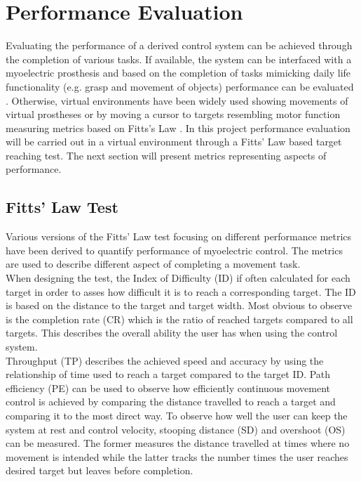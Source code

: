 \section{Performance Evaluation}

Evaluating the performance of a derived control system can be achieved through the completion of various tasks. If available, the system can be interfaced with a myoelectric prosthesis and based on the completion of tasks mimicking daily life functionality (e.g. grasp and movement of objects) performance can be evaluated \cite{Mastinu2018}. Otherwise, virtual environments have been widely used showing movements of virtual prostheses \cite{Powell2014} or by moving a cursor to targets resembling motor function measuring metrics based on Fitts's Law \cite{Wurth2014,Scheme2013,Hahne2014}. In this project performance evaluation will be carried out in a virtual environment through a Fitts' Law based target reaching test. The next section will present metrics representing aspects of performance. 

\subsection{Fitts' Law Test}        

Various versions of the Fitts' Law test focusing on different performance metrics have been derived to quantify performance of myoelectric control. The metrics are used to describe different aspect of completing a movement task. \\
When designing the test, the Index of Difficulty (ID) if often calculated for each target in order to asses how difficult it is to reach a corresponding target. The ID is based on the distance to the target and target width.  
Most obvious to observe is the completion rate (CR) which is the ratio of reached targets compared to all targets. This describes the overall ability the user has when using the control system. \\
Throughput (TP) describes the achieved speed and accuracy by using the relationship of time used to reach a target compared to the target ID. 
Path efficiency (PE) can be used to observe how efficiently continuous movement control is achieved by comparing the distance travelled to reach a target and comparing it to the most direct way. 
To observe how well the user can keep the system at rest and control velocity, stooping distance (SD) and overshoot (OS) can be measured. The former measures the distance travelled at times where no movement is intended while the latter tracks the number times the user reaches desired target but leaves before completion. \cite{Scheme2013}
